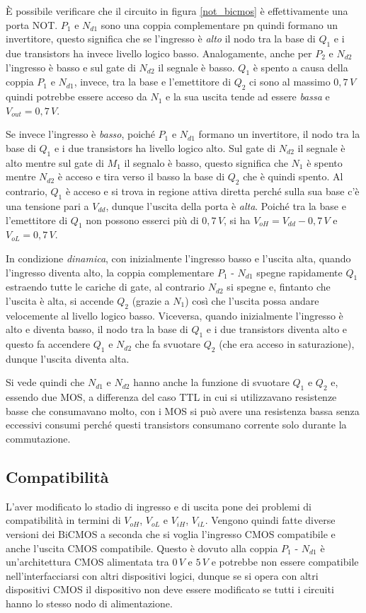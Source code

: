 \documentclass[12pt, a4paper]{report}
\begin{document}
È possibile verificare che il circuito in figura \ref{not_bicmos} è effettivamente una porta NOT. $P_1$ e $N_{d1}$ sono una coppia complementare pn quindi formano un invertitore, questo significa che se l'ingresso è \textit{alto} il nodo tra la base di $Q_1$ e i due transistors ha invece livello logico basso. Analogamente, anche per $P_2$ e $N_{d2}$ l'ingresso è basso e sul gate di $N_{d2}$ il segnale è basso. $Q_1$ è spento a causa della coppia $P_1$ e $N_{d1}$, invece, tra la base e l'emettitore di $Q_2$ ci sono al massimo $0,7\,V$ quindi potrebbe essere acceso da $N_1$ e la sua uscita tende ad essere \textit{bassa} e $V_{out} = 0,7\,V$.

Se invece l'ingresso è \textit{basso}, poiché $P_1$ e $N_{d1}$ formano un invertitore, il nodo tra la base di $Q_1$ e i due transistors ha livello logico alto. Sul gate di $N_{d2}$ il segnale è alto mentre sul gate di $M_1$ il segnalo è basso, questo significa che $N_1$ è spento mentre $N_{d2}$ è acceso e tira verso il basso la base di $Q_2$ che è quindi spento. Al contrario, $Q_1$ è acceso e si trova in regione attiva diretta perché sulla sua base c'è una tensione pari a $V_{dd}$, dunque l'uscita della porta è \textit{alta}. Poiché tra la base e l'emettitore di $Q_1$ non possono esserci più di $0,7\,V$, si ha $V_{oH} = V_{dd} - 0,7\,V$ e $V_{oL} = 0,7\,V$.

In condizione \textit{dinamica}, con inizialmente l'ingresso basso e l'uscita alta, quando l'ingresso diventa alto, la coppia complementare $P_1$ - $N_{d1}$ spegne rapidamente $Q_1$ estraendo tutte le cariche di gate, al contrario $N_{d2}$ si spegne e, fintanto che l'uscita è alta, si accende $Q_2$ (grazie a $N_1$) così che l'uscita possa andare velocemente al livello logico basso. Viceversa, quando inizialmente l'ingresso è alto e diventa basso, il nodo tra la base di $Q_1$ e i due transistors diventa alto e questo fa accendere $Q_1$ e $N_{d2}$ che fa svuotare $Q_2$ (che era acceso in saturazione), dunque l'uscita diventa alta.

Si vede quindi che $N_{d1}$ e $N_{d2}$ hanno anche la funzione di svuotare $Q_1$ e $Q_2$ e, essendo due MOS, a differenza del caso TTL in cui si utilizzavano resistenze basse che consumavano molto, con i MOS si può avere una resistenza bassa senza eccessivi consumi perché questi transistors consumano corrente solo durante la commutazione.

\subsection{Compatibilità}
L'aver modificato lo stadio di ingresso e di uscita pone dei problemi di compatibilità in termini di $V_{oH}$, $V_{oL}$ e $V_{iH}$, $V_{iL}$. Vengono quindi fatte diverse versioni dei BiCMOS a seconda che si voglia l'ingresso CMOS compatibile e anche l'uscita CMOS compatibile. Questo è dovuto alla coppia $P_1$ - $N_{d1}$ è un'architettura CMOS alimentata tra $0\,V$ e $5\,V$ e potrebbe non essere compatibile nell'interfacciarsi con altri dispositivi logici, dunque se si opera con altri dispositivi CMOS il dispositivo non deve essere modificato se tutti i circuiti hanno lo stesso nodo di alimentazione.
\end{document}
